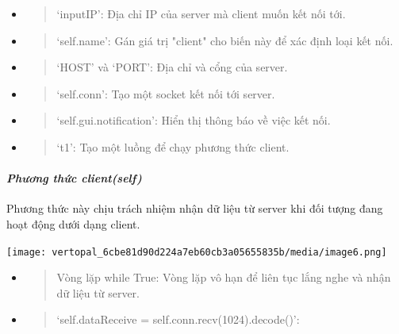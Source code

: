 \documentclass[a4paper]{article}
\begin{document}
\begin{itemize}
\item
  \begin{quote}
  `inputIP': Địa chỉ IP của server mà client muốn kết nối tới.
  \end{quote}
\item
  \begin{quote}
  `self.name': Gán giá trị "client" cho biến này để xác định loại kết
  nối.
  \end{quote}
\item
  \begin{quote}
  `HOST' và `PORT': Địa chỉ và cổng của server.
  \end{quote}
\item
  \begin{quote}
  `self.conn': Tạo một socket kết nối tới server.
  \end{quote}
\item
  \begin{quote}
  `self.gui.notification': Hiển thị thông báo về việc kết nối.
  \end{quote}
\item
  \begin{quote}
  `t1': Tạo một luồng để chạy phương thức client.
  \end{quote}
\end{itemize}

\hypertarget{phux1b0ux1a1ng-thux1ee9c-clientself}{%
\paragraph{\texorpdfstring{\emph{Phương thức
client(self)}}{Phương thức client(self)}}\label{phux1b0ux1a1ng-thux1ee9c-clientself}}

Phương thức này chịu trách nhiệm nhận dữ liệu từ server khi đối tượng
đang hoạt động dưới dạng client.

\texttt{[image: vertopal\_6cbe81d90d224a7eb60cb3a05655835b/media/image6.png]}

\begin{itemize}
\item
  \begin{quote}
  Vòng lặp while True: Vòng lặp vô hạn để liên tục lắng nghe và nhận dữ
  liệu từ server.
  \end{quote}
\item
  \begin{quote}
  `self.dataReceive = self.conn.recv(1024).decode()':
  \end{quote}
\end{itemize}
\end{document}
